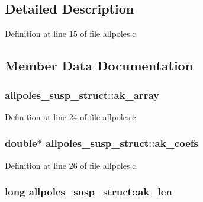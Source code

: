 \subsection{Detailed Description}


Definition at line 15 of file allpoles.\+c.



\subsection{Member Data Documentation}
\subsubsection[{\texorpdfstring{ak\+\_\+array}{ak_array}}]{ allpoles\+\_\+susp\+\_\+struct\+::ak\+\_\+array}\hypertarget{structallpoles__susp__struct_a9d4a5afcf3bade4bd6d4ce56926f5ba0}{}\label{structallpoles__susp__struct_a9d4a5afcf3bade4bd6d4ce56926f5ba0}


Definition at line 24 of file allpoles.\+c.

\subsubsection[{\texorpdfstring{ak\+\_\+coefs}{ak_coefs}}]{\setlength{\rightskip}{0pt plus 5cm}double$\ast$ allpoles\+\_\+susp\+\_\+struct\+::ak\+\_\+coefs}\hypertarget{structallpoles__susp__struct_ac2ebf26d0f6dcab575ae7c576a197f0f}{}\label{structallpoles__susp__struct_ac2ebf26d0f6dcab575ae7c576a197f0f}


Definition at line 26 of file allpoles.\+c.

\subsubsection[{\texorpdfstring{ak\+\_\+len}{ak_len}}]{\setlength{\rightskip}{0pt plus 5cm}long allpoles\+\_\+susp\+\_\+struct\+::ak\+\_\+len}\hypertarget{structallpoles__susp__struct_a29aa697d50583d6db64a67d30b8cbdf2}{}\label{structallpoles__susp__struct_a29aa697d50583d6db64a67d30b8cbdf2}


